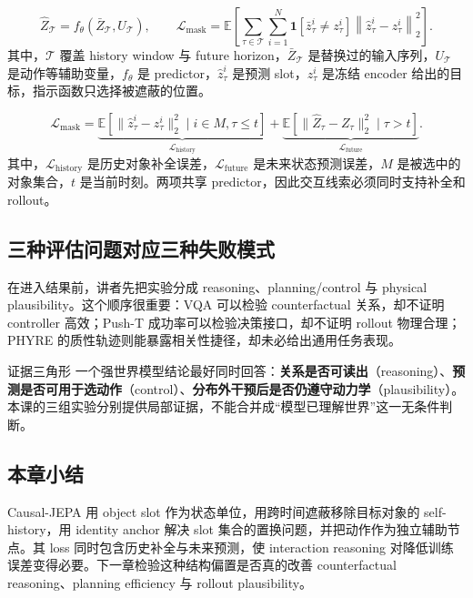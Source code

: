 
\[
\hat Z_{\mathcal T}=f_\theta(\bar Z_{\mathcal T},U_{\mathcal T}),
\qquad
\mathcal{L}_{\text{mask}}
=\mathbb{E}\!\left[
\sum_{\tau\in\mathcal T}\sum_{i=1}^{N}
\mathbf{1}[\bar z_\tau^i\neq z_\tau^i]
\left\|\hat z_\tau^i-z_\tau^i\right\|_2^2
\right].
\]
其中，$\mathcal T$ 覆盖 history window 与 future horizon，$\bar Z_{\mathcal T}$ 是替换过的输入序列，$U_{\mathcal T}$ 是动作等辅助变量，$f_\theta$ 是 predictor，$\hat z_\tau^i$ 是预测 slot，$z_\tau^i$ 是冻结 encoder 给出的目标，指示函数只选择被遮蔽的位置。

\[
\mathcal{L}_{\text{mask}}
=\underbrace{\mathbb{E}\!\left[\|\hat z_\tau^i-z_\tau^i\|_2^2\mid i\in M,\tau\le t\right]}_{\mathcal{L}_{\text{history}}}
+\underbrace{\mathbb{E}\!\left[\|\hat Z_\tau-Z_\tau\|_2^2\mid\tau>t\right]}_{\mathcal{L}_{\text{future}}}.
\]
其中，$\mathcal{L}_{\text{history}}$ 是历史对象补全误差，$\mathcal{L}_{\text{future}}$ 是未来状态预测误差，$M$ 是被选中的对象集合，$t$ 是当前时刻。两项共享 predictor，因此交互线索必须同时支持补全和 rollout。


\subsection{三种评估问题对应三种失败模式}

在进入结果前，讲者先把实验分成 reasoning、planning/control 与 physical plausibility。这个顺序很重要：VQA 可以检验 counterfactual 关系，却不证明 controller 高效；Push-T 成功率可以检验决策接口，却不证明 rollout 物理合理；PHYRE 的质性轨迹则能暴露相关性捷径，却未必给出通用任务表现。


\begin{importantbox}{证据三角形}
一个强世界模型结论最好同时回答：\textbf{关系是否可读出}（reasoning）、\textbf{预测是否可用于选动作}（control）、\textbf{分布外干预后是否仍遵守动力学}（plausibility）。本课的三组实验分别提供局部证据，不能合并成``模型已理解世界''这一无条件判断。
\end{importantbox}

\subsection{本章小结}

Causal-JEPA 用 object slot 作为状态单位，用跨时间遮蔽移除目标对象的 self-history，用 identity anchor 解决 slot 集合的置换问题，并把动作作为独立辅助节点。其 loss 同时包含历史补全与未来预测，使 interaction reasoning 对降低训练误差变得必要。下一章检验这种结构偏置是否真的改善 counterfactual reasoning、planning efficiency 与 rollout plausibility。

